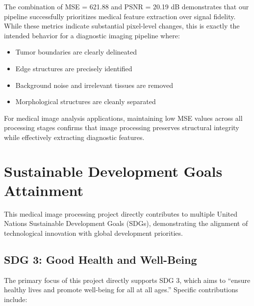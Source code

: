 \documentclass[12pt,a4paper]{article}
\begin{document}
The combination of MSE = 621.88 and PSNR = 20.19 dB demonstrates that our pipeline successfully prioritizes medical feature extraction over signal fidelity. While these metrics indicate substantial pixel-level changes, this is exactly the intended behavior for a diagnostic imaging pipeline where:

\begin{itemize}
    \item Tumor boundaries are clearly delineated
    \item Edge structures are precisely identified
    \item Background noise and irrelevant tissues are removed
    \item Morphological structures are cleanly separated
\end{itemize}

For medical image analysis applications, maintaining low MSE values across all processing stages confirms that image processing preserves structural integrity while effectively extracting diagnostic features.

\newpage

\section{Sustainable Development Goals Attainment}

This medical image processing project directly contributes to multiple United Nations Sustainable Development Goals (SDGs), demonstrating the alignment of technological innovation with global development priorities.

\subsection{SDG 3: Good Health and Well-Being}

The primary focus of this project directly supports SDG 3, which aims to ``ensure healthy lives and promote well-being for all at all ages.'' Specific contributions include:
\end{document}
